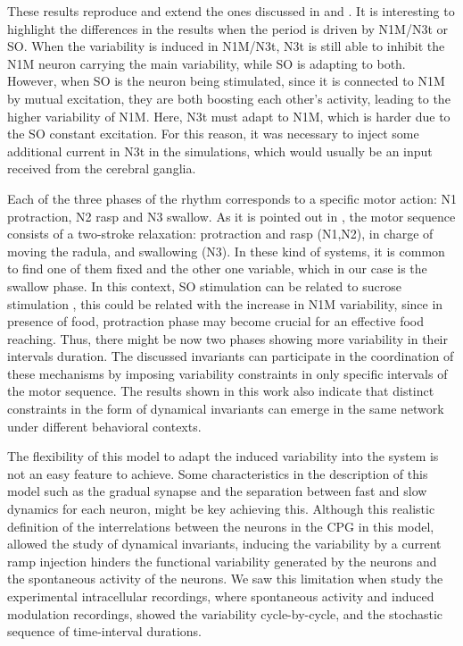 These results reproduce and extend the ones discussed in \textcite{vavoulis_dynamic_2007} and \textcite{elliott_temporal_1991}. It is interesting to highlight the differences in the results when the period is driven by N1M/N3t or SO. When the variability is induced in N1M/N3t, N3t is still able to inhibit the N1M neuron carrying the main variability, while SO is adapting to both. However, when SO is the neuron being stimulated, since it is connected to N1M by mutual excitation, they are both boosting each other's activity, leading to the higher variability of N1M. Here, N3t must adapt to N1M, which is harder due to the SO constant excitation. For this reason, it was necessary to inject some additional current in N3t in the simulations, which would usually be an input received from the cerebral ganglia. 

Each of the three phases of the rhythm corresponds to a specific motor action: N1 protraction, N2 rasp and N3 swallow. As it is pointed out in \textcite{elliott_temporal_1991}, the motor sequence consists of a two-stroke relaxation: protraction and rasp (N1,N2), in charge of moving the radula, and swallowing (N3). In these kind of systems, it is common to find one of them fixed and the other one variable, which in our case is the swallow phase. In this context, SO stimulation can be related to sucrose stimulation \parencite{benjamin_distributed_2012,kemenes_analysis_1994},
this could be related with the increase in N1M variability, since in presence of food, protraction phase may become crucial for an effective food reaching. Thus, there might be now two phases showing more variability in their intervals duration. The discussed invariants can participate in the coordination of these mechanisms by imposing  variability constraints in only specific intervals of the motor sequence. The results shown in this work also indicate that distinct constraints in the form of dynamical invariants can emerge in the same network under different behavioral contexts.

The flexibility of this model to adapt the induced variability into the system is not an easy feature to achieve. Some characteristics in the description of this model such as the gradual synapse and the separation between fast and slow dynamics for each neuron, might be key achieving this. Although this realistic definition of the interrelations between the neurons in the CPG in this model, allowed the study of dynamical invariants, inducing the variability by a current ramp injection hinders the functional variability generated by the neurons and the spontaneous activity of the neurons. We saw this limitation when study the experimental intracellular recordings, where spontaneous activity and induced modulation recordings, showed the variability cycle-by-cycle, and the stochastic sequence of time-interval durations. 

